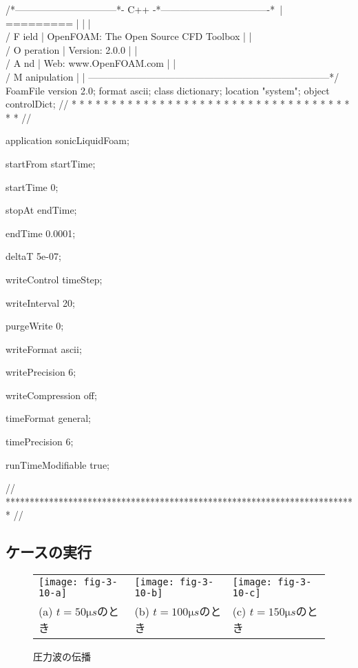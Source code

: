 \begin{OFverbatim}
/*--------------------------------*- C++ -*----------------------------------*\
| =========                 |                                                 |
| \\      /  F ield         | OpenFOAM: The Open Source CFD Toolbox           |
|  \\    /   O peration     | Version:  2.0.0                                 |
|   \\  /    A nd           | Web:      www.OpenFOAM.com                      |
|    \\/     M anipulation  |                                                 |
\*---------------------------------------------------------------------------*/
FoamFile
{
    version     2.0;
    format      ascii;
    class       dictionary;
    location    "system";
    object      controlDict;
}
// * * * * * * * * * * * * * * * * * * * * * * * * * * * * * * * * * * * * * //

application     sonicLiquidFoam;

startFrom       startTime;

startTime       0;

stopAt          endTime;

endTime         0.0001;

deltaT          5e-07;

writeControl    timeStep;

writeInterval   20;

purgeWrite      0;

writeFormat     ascii;

writePrecision  6;

writeCompression off;

timeFormat      general;

timePrecision   6;

runTimeModifiable true;


// ************************************************************************* //
\end{OFverbatim}


\subsection{ケースの実行}
\label{ssec:3.4.4}


\begin{figure}[ht]
 \tabcolsep=1pt
 \begin{tabular}{lll}
  \texttt{[image: fig-3-10-a]} &
  \texttt{[image: fig-3-10-b]} &
  \texttt{[image: fig-3-10-c]} \\
  (a) $t =  50 \unit{\micro s}$のとき &
  (b) $t = 100 \unit{\micro s}$のとき &
  (c) $t = 150 \unit{\micro s}$のとき
 \end{tabular}
 \caption{圧力波の伝播}
 \label{fig:3.10}
\end{figure}


